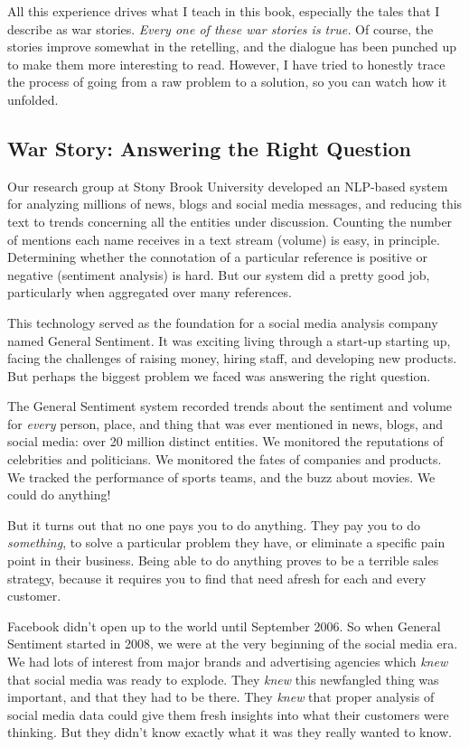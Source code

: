 \documentclass[10pt]{article}
\begin{document}
All this experience drives what I teach in this book, especially the tales that I describe as war stories. \textit{Every one of these war stories is true.} Of course, the stories improve somewhat in the retelling, and the dialogue has been punched up to make them more interesting to read. However, I have tried to honestly trace the process of going from a raw problem to a solution, so you can watch how it unfolded.

\subsection{War Story: Answering the Right Question}
Our research group at Stony Brook University developed an NLP-based system for analyzing millions of news, blogs and social media messages, and reducing this text to trends concerning all the entities under discussion. Counting the number of mentions each name receives in a text stream (volume) is easy, in principle. Determining whether the connotation of a particular reference is positive or negative (sentiment analysis) is hard. But our system did a pretty good job, particularly when aggregated over many references.

This technology served as the foundation for a social media analysis company named General Sentiment. It was exciting living through a start-up starting up, facing the challenges of raising money, hiring staff, and developing new products. But perhaps the biggest problem we faced was answering the right question.

The General Sentiment system recorded trends about the sentiment and volume for \textit{every} person, place, and thing that was ever mentioned in news, blogs, and social media: over 20 million distinct entities. We monitored the reputations of celebrities and politicians. We monitored the fates of companies and products. We tracked the performance of sports teams, and the buzz about movies. We could do anything!

But it turns out that no one pays you to do anything. They pay you to do \textit{something}, to solve a particular problem they have, or eliminate a specific pain point in their business. Being able to do anything proves to be a terrible sales strategy, because it requires you to find that need afresh for each and every customer.

Facebook didn't open up to the world until September 2006. So when General Sentiment started in 2008, we were at the very beginning of the social media era. We had lots of interest from major brands and advertising agencies which \textit{knew} that social media was ready to explode. They \textit{knew} this newfangled thing was important, and that they had to be there. They \textit{knew} that proper analysis of social media data could give them fresh insights into what their customers were thinking. But they didn't know exactly what it was they really wanted to know.
\end{document}
